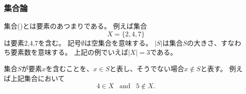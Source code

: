 \begin{comment}
\subsubsection{Set theory}
\end{comment}

\subsubsection{集合論}




\begin{comment}
A \key{set} is a collection of elements.
For example, the set
\[X=\{2,4,7\}\]
contains elements 2, 4 and 7.
The symbol $\emptyset$ denotes an empty set,
and $|S|$ denotes the size of a set $S$,
i.e., the number of elements in the set.
For example, in the above set, $|X|=3$.
\end{comment}

集合()とは要素のあつまりである。
例えば集合
\[X=\{2,4,7\}\]
は要素2,4,7を含む。
記号$\emptyset$は空集合を意味する。
$|S|$は集合$S$の大きさ、すなわち要素数を意味する。
上記の例でいえば$|X|=3$である。

\begin{comment}
If a set $S$ contains an element $x$,
we write $x \in S$,
and otherwise we write $x \notin S$.
For example, in the above set
\[4 \in X \hspace{10pt}\textrm{and}\hspace{10pt} 5 \notin X.\]
\end{comment}

集合$S$が要素$x$を含むことを、$x \in S$と表し、そうでない場合$x \notin S$と表す。
例えば上記集合において
\[4 \in X \hspace{10pt}\textrm{and}\hspace{10pt} 5 \notin X.\]

